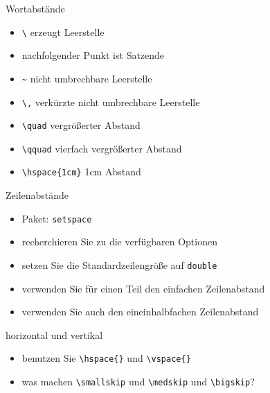 \begin{frame}{Wortabstände}
\begin{itemize}
    \item \texttt{\textbackslash} erzeugt Leerstelle
    \item \texttt{\textbackslash@} nachfolgender Punkt ist Satzende
    \item \texttt{\textasciitilde}  nicht umbrechbare Leerstelle 
    \item \texttt{\textbackslash{,}} verkürzte nicht umbrechbare Leerstelle
    \item \texttt{{\textbackslash quad}} vergrößerter Abstand
    \item \texttt{{\textbackslash qquad}} vierfach vergrößerter Abstand
    \item \texttt{{\textbackslash hspace\{1cm}\}} 1cm Abstand
\end{itemize}
\end{frame}

\begin{frame}[fragile]{Zeilenabstände}
    \begin{itemize}
        \item Paket: \lstinline|setspace|
        \item recherchieren Sie zu die verfügbaren Optionen
        \item setzen Sie die Standardzeilengröße auf \texttt{double}
        \item verwenden Sie für einen Teil den einfachen Zeilenabstand
        \item verwenden Sie auch den eineinhalbfachen Zeilenabstand
    \end{itemize}
\end{frame}


\begin{frame}[fragile]{horizontal und vertikal}
    \begin{itemize}
        \item benutzen Sie \lstinline|\hspace{}| und \lstinline|\vspace{}|
        \item was machen \lstinline|\smallskip| und \lstinline|\medskip| und \lstinline|\bigskip|?
    \end{itemize}
\end{frame}

